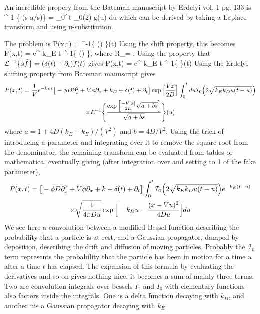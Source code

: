 {An incredible propery from the Bateman manuscript by Erdelyi vol. 1 pg. 133 is
\be {}^{-1} \Big\{  (s-a/s)\Big\} = \int_0^t _0\Big(2\Big) g(u) du
\ee
which can be derived by taking a Laplace transform and using u-substitution.

The problem is
\be P(x,t) = ^{-1}\Bigg\{   \exp\Big(\Big)  \Bigg\}(t) \ee
Using the shift property, this becomes
\be P(x,t) = e^{-k_E t} ^{-1}\Bigg\{  \exp\Big(\Big)  \Bigg\},\ee
where 
\be R_\ast = . \ee
Using the property that $\mathcal{L}^{-1}\big\{s \tilde{f}\big\} = (\delta(t) + \partial_t)f(t)$ gives
\be P(x,t) =  e^{-k_E t}  \exp{} ^{-1}\Bigg\{  \Bigg\}(t) \ee
Using the Erdelyi shifting property from Bateman manuscript gives 
\begin{multline}  P(x,t) = \frac{1}{V} e^{-k_E t}  \big[ -\phi D\partial_x^2 + V\phi \partial_x + k_D + \delta(t) + \partial_t \big] \exp\Big[\frac{Vx}{2D}\Big] \int_0^t du \mathcal{I}_0\Big( 2 \sqrt{k_Ek_D u(t-u)}\Big) \\ \times \mathcal{L}^{-1}\Bigg\{ \frac{\exp\Big[ \frac{-V|x|}{2D}\sqrt{a+b s}\Big]}{\sqrt{a + b s}}\Bigg\}(u) \end{multline}
where $a = 1 + 4D(k_E-k_E)/(V^2)$ and $b = 4D/V^2$.
Using the trick of introducing a parameter and integrating over it to remove the square root from the denominator, the remaining transform can be evaluated from tables or mathematica, eventually giving (after integration over and setting to 1 of the fake parameter),
\begin{multline} P(x,t) = \big[-\phi D\partial_x^2 + V\phi \partial_x + k + \delta(t)+ \partial_t \big]\int_0^t \mathcal{I}_0\Big( 2 \sqrt{k_Ek_D u(t-u)}\Big) e^{-k_E(t-u)} \\ \times \sqrt{ \frac{1}{4\pi D u}} \exp\Big[-k_D u - \frac{(x-Vu)^2}{4Du}\Big] du \end{multline}
We see here a convolution between a modified Bessel function describing the probability that a particle is at rest, and a Gaussian propagator, damped by deposition, describing the drift and diffusion of moving particles.
Probably the $\mathcal{I}_0$ term represents the probability that the particle has been in motion for a time $u$ after a time $t$ has elapsed.
The expansion of this formula by evaluating the derivatives and so on gives nothing nice. it becomes a sum of mainly three terms. Two are convolution integrals over bessels $I_1$ and $I_0$ with elementary functions also factors inside the integrals. One is a delta function decaying with $k_D$, and another uis a Gaussian propagator decaying with $k_E$.

}
